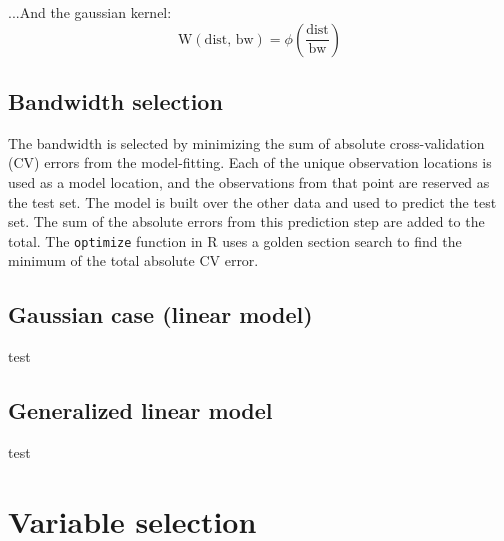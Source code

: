 \documentclass[10pt]{amsart}
\begin{document}
		...And the gaussian kernel:
		\[
			\text{W}(\text{dist, bw}) = \phi(\frac{\text{dist}}{\text{bw}})
		\]


	\subsection{Bandwidth selection}
		The bandwidth is selected by minimizing the sum of absolute cross-validation (CV) errors from the model-fitting. Each of the unique observation locations is used as a model location, and the observations from that point are reserved as the test set. The model is built over the other data and used to predict the test set. The sum of the absolute errors from this prediction step are added to the total. The \verb!optimize! function in R uses a golden section search to find the minimum of the total absolute CV error.\\

	\subsection{Gaussian case (linear model)}
		test

	\subsection{Generalized linear model}
		test


\section{Variable selection}




\end{document}

